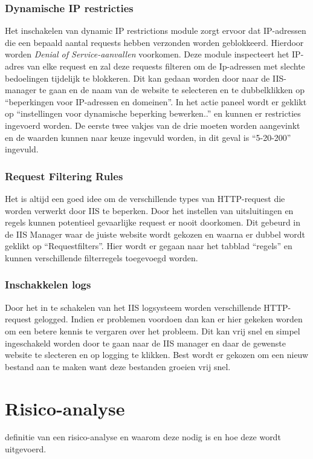 \documentclass[pdftex,a4paper,12pt]{report}
\begin{document}
\subsection{Dynamische IP restricties}
Het inschakelen van dynamic IP restrictions module zorgt ervoor dat IP-adressen die een bepaald aantal requests hebben verzonden worden geblokkeerd. Hierdoor worden \textit{Denial of Service-aanvallen} voorkomen. Deze module inspecteert het IP-adres van elke request en zal deze requests filteren om de Ip-adressen met slechte bedoelingen tijdelijk te blokkeren. Dit kan gedaan worden door naar de IIS-manager te gaan en de naam van de website te selecteren en te dubbelklikken op "`beperkingen voor IP-adressen en domeinen"'. In het actie paneel wordt er geklikt op "`instellingen voor dynamische beperking bewerken.."' en kunnen er restricties ingevoerd worden. De eerste twee vakjes van de drie moeten worden aangevinkt en de waarden kunnen naar keuze ingevuld worden, in dit geval is "`5-20-200"' ingevuld. 

\subsection{Request Filtering Rules}
Het is altijd een goed idee om de verschillende types van HTTP-request die worden verwerkt door IIS te beperken. Door het instellen van uitsluitingen en regels kunnen potentieel gevaarlijke request er nooit doorkomen. Dit gebeurd in de IIS Manager waar de juiste website wordt gekozen en waarna er dubbel wordt geklikt op "`Requestfilters"'. Hier wordt er gegaan naar het tabblad "`regels"' en kunnen verschillende filterregels toegevoegd worden.

\subsection{Inschakkelen logs}
Door het in te schakelen van het IIS logsysteem worden verschillende HTTP-request gelogged. Indien er problemen voordoen dan kan er hier gekeken worden om een betere kennis te vergaren over het probleem. Dit kan vrij snel en simpel ingeschakeld worden door te gaan naar de IIS manager en daar de gewenste website te slecteren en op logging te klikken. Best wordt er gekozen om een nieuw bestand aan te maken want deze bestanden groeien vrij snel.

\chapter{Risico-analyse}
definitie van een risico-analyse en waarom deze nodig is en hoe deze wordt uitgevoerd.
\end{document}
